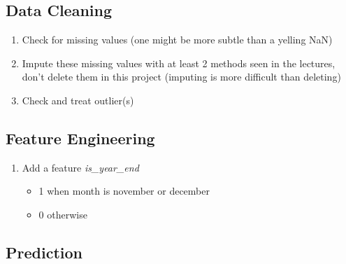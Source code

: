 \subsection{Data Cleaning}

\begin{enumerate}
    \item Check for missing values (one might be more subtle than a yelling NaN)
    \item Impute these missing values with at least 2 methods seen in the lectures, 
    don't delete them in this project (imputing is more difficult than deleting)
    \item Check and treat outlier(s)
\end{enumerate}

\subsection{Feature Engineering}

\begin{enumerate}
    \item Add a feature \textit{is\_year\_end}
    \begin{itemize}
        \item 1 when month is november or december
        \item 0 otherwise
    \end{itemize}
\end{enumerate}

\subsection{Prediction}

